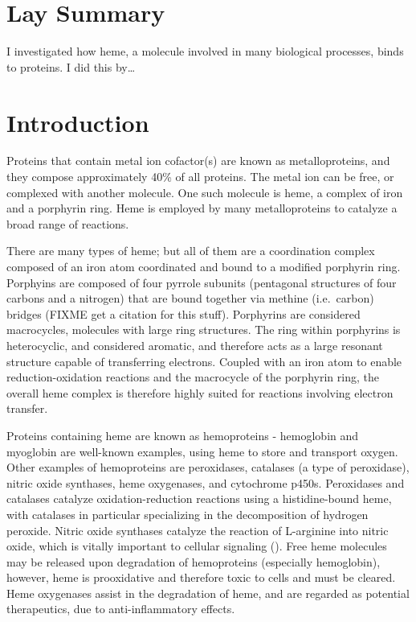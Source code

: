 \documentclass[a4paper, nobind]{templates/ociamthesis}
\begin{document}
\flushbottom

\hypertarget{lay-summary}{%
\chapter*{Lay Summary}\label{lay-summary}}

\adjustmtc
{}

I investigated how heme, a molecule involved in many biological processes, binds to proteins. I did this by\ldots{}

\hypertarget{introduction}{%
\chapter*{Introduction}\label{introduction}}

\adjustmtc
{}

Proteins that contain metal ion cofactor(s) are known as metalloproteins, and they compose approximately 40\% of all proteins. The metal ion can be free, or complexed with another molecule. One such molecule is heme, a complex of iron and a porphyrin ring. Heme is employed by many metalloproteins to catalyze a broad range of reactions.

There are many types of heme; but all of them are a coordination complex composed of an iron atom coordinated and bound to a modified porphyrin ring. Porphyins are composed of four pyrrole subunits (pentagonal structures of four carbons and a nitrogen) that are bound together via methine (i.e.~carbon) bridges (FIXME get a citation for this stuff). Porphyrins are considered macrocycles, molecules with large ring structures. The ring within porphyrins is heterocyclic, and considered aromatic, and therefore acts as a large resonant structure capable of transferring electrons. Coupled with an iron atom to enable reduction-oxidation reactions and the macrocycle of the porphyrin ring, the overall heme complex is therefore highly suited for reactions involving electron transfer.

Proteins containing heme are known as hemoproteins - hemoglobin and myoglobin are well-known examples, using heme to store and transport oxygen. Other examples of hemoproteins are peroxidases, catalases (a type of peroxidase), nitric oxide synthases, heme oxygenases, and cytochrome p450s. Peroxidases and catalases catalyze oxidation-reduction reactions using a histidine-bound heme, with catalases in particular specializing in the decomposition of hydrogen peroxide. Nitric oxide synthases catalyze the reaction of L-arginine into nitric oxide, which is vitally important to cellular signaling (\textcite{Poulos2014}). Free heme molecules may be released upon degradation of hemoproteins (especially hemoglobin), however, heme is prooxidative and therefore toxic to cells and must be cleared. Heme oxygenases assist in the degradation of heme, and are regarded as potential therapeutics, due to anti-inflammatory effects\autocite{Araujo2012}.
\end{document}
